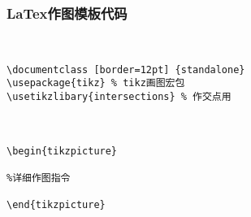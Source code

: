 \begin{frame}[fragile]
\frametitle{LaTex作图模板代码}
\fontsize{28}{32}\\
\vspace{12pt}
\begin{lstlisting}
\documentclass [border=12pt] {standalone}
\usepackage{tikz} % tikz画图宏包
\usetikzlibary{intersections} % 作交点用



\begin{tikzpicture}

%详细作图指令

\end{tikzpicture}

\end{lstlisting}

\end{frame}
